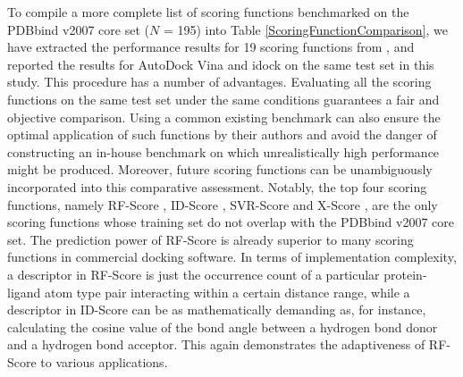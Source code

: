 To compile a more complete list of scoring functions benchmarked on the PDBbind v2007 core set ($N$ = 195) into Table \ref{ScoringFunctionComparison}, we have extracted the performance results for 19 scoring functions from \citep{1313,564,1305,1295}, and reported the results for AutoDock Vina and idock on the same test set in this study. This procedure has a number of advantages. Evaluating all the scoring functions on the same test set under the same conditions guarantees a fair and objective comparison. Using a common existing benchmark can also ensure the optimal application of such functions by their authors and avoid the danger of constructing an in-house benchmark on which unrealistically high performance might be produced. Moreover, future scoring functions can be unambiguously incorporated into this comparative assessment. Notably, the top four scoring functions, namely RF-Score \citep{564}, ID-Score \citep{1305}, SVR-Score \citep{1295} and X-Score \citep{573}, are the only scoring functions whose training set do not overlap with the PDBbind v2007 core set. The prediction power of RF-Score is already superior to many scoring functions in commercial docking software. In terms of implementation complexity, a descriptor in RF-Score is just the occurrence count of a particular protein-ligand atom type pair interacting within a certain distance range, while a descriptor in ID-Score can be as mathematically demanding as, for instance, calculating the cosine value of the bond angle between a hydrogen bond donor and a hydrogen bond acceptor. This again demonstrates the adaptiveness of RF-Score to various applications.


